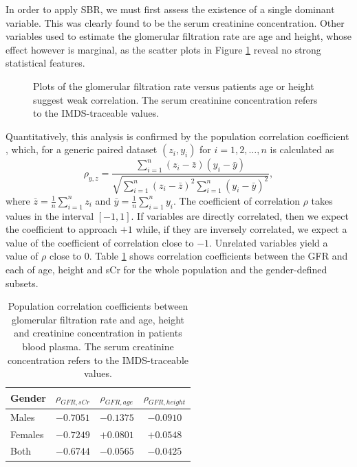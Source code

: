 \documentclass[10pt,final]{siamltex}
\begin{document}
In order to apply SBR, we must first assess the existence of a single dominant variable. This was clearly found to be the serum creatinine concentration. Other variables used to estimate the glomerular filtration rate are age and height, whose effect however is marginal, as the scatter plots in Figure \ref{recessive} reveal no strong statistical features.
%
\begin{figure}[ht]
  \centering
  \caption{Plots of the glomerular filtration rate versus patients age or height suggest weak correlation. The serum creatinine concentration refers to the IMDS-traceable values.}
  \label{recessive}
\end{figure}
%
Quantitatively, this analysis is confirmed by the population correlation coefficient \cite{mukaka}, which, for a generic paired dataset $(z_i, y_i)$ for $i = 1, 2, \ldots, n$ is calculated as
%
\begin{equation}
\rho_{y,z} = \frac{\sum_{i = 1}^n{(z_i-\bar{z})(y_i-\bar{y})}}
{\sqrt{\sum_{i=1}^n{(z_i-\bar{z})^2}\sum_{i=1}^n{(y_i-\bar{y})^2}}},
\end{equation}
%
where $\bar{z}=\tfrac{1}{n}\sum_{i=1}^nz_i$ and $\bar{y}=\tfrac{1}{n}\sum_{i=1}^ny_i$. The coefficient of correlation $\rho$ takes values in the interval $[-1,1]$. If variables are directly correlated, then we expect the coefficient to approach $+1$ while, if they are inversely correlated, we expect a value of the coefficient of correlation close to $-1$. Unrelated variables yield a value of $\rho$ close to $0$. Table \ref{corr} shows correlation coefficients between the GFR and each of age, height and sCr for the whole population and the gender-defined subsets.
%
\begin{table}[ht]
  \centering
  \begin{tabular}{|l|c|c|c|}
    \hline
    \textbf{Gender}&$\rho_{\mathit{GFR},sCr}$&$\rho_{\mathit{GFR},age}$&$\rho_{\mathit{GFR},height}$\\
    \hline
    \textrm{Males}     & $-0.7051$ & $-0.1375$ & $-0.0910$  \\
    \hline
    \textrm{Females}   & $-0.7249$ &  $+0.0801$ &  $+0.0548$  \\
    \hline
    \textrm{Both}      & $-0.6744$ & $-0.0565$ & $-0.0425$  \\
    \hline
  \end{tabular}
  \caption{Population correlation coefficients between glomerular filtration rate and age, height and creatinine concentration in patients blood plasma. The serum creatinine concentration refers to the IMDS-traceable values.}
  \label{corr}
\end{table}
\end{document}
